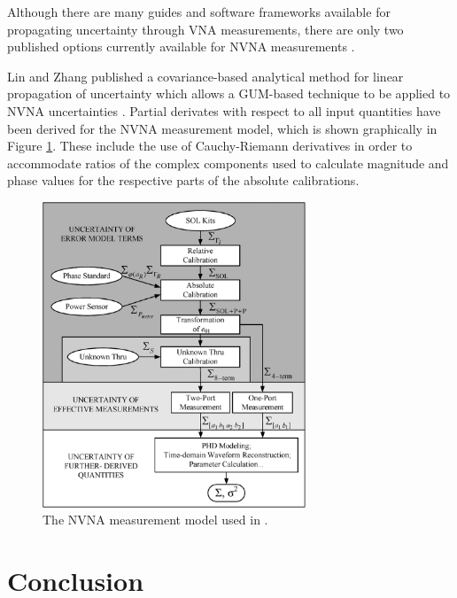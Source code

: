 \documentclass[../thesis/thesis.tex]{subfiles}
\begin{document}
\begin{refsection}
Although there are many guides and software frameworks available for propagating uncertainty through VNA measurements, there are only two published options currently available for NVNA measurements \cite{Lin_2012, MUFWebsite}.

Lin and Zhang published a covariance-based analytical method for linear propagation of uncertainty which allows a GUM-based technique to be applied to NVNA uncertainties \cite{Lin_2012}. Partial derivates with respect to all input quantities have been derived for the NVNA measurement model, which is shown graphically in Figure \ref{ch4_fig_linmodel}. These include the use of Cauchy-Riemann derivatives in order to accommodate ratios of the complex components used to calculate magnitude and phase values for the respective parts of the absolute calibrations.

\begin{figure}
	\centering
	\includegraphics[width=0.7\textwidth]{linmodel.png}
	\caption{The NVNA measurement model used in \cite{Lin_2012}.}
	\label{ch4_fig_linmodel}
\end{figure}



\section{Conclusion}
\printbibliography[title=References]
\end{refsection}
\end{document}
